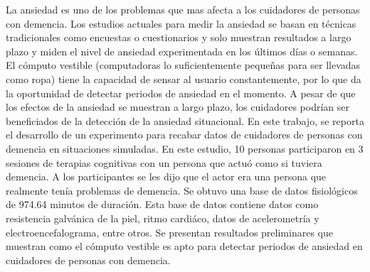 La ansiedad es uno de los problemas que mas afecta a los cuidadores de personas con demencia. Los estudios actuales para medir la ansiedad se basan en t\'ecnicas tradicionales como encuestas o cuestionarios y solo muestran resultados a largo plazo y miden el nivel de ansiedad experimentada en los \'ultimos d\'ias o semanas. El c\'omputo vestible (computadoras lo suficientemente peque\~nas para ser llevadas como ropa) tiene la capacidad de sensar al usuario constantemente, por lo que da la oportunidad de detectar periodos de ansiedad en el momento. A pesar de que los efectos de la ansiedad se muestran a largo plazo, los cuidadores podr\'ian ser beneficiados de la detecci\'on de la ansiedad situacional. En este trabajo, se reporta el desarrollo de un experimento para recabar datos de cuidadores de personas con demencia en situaciones simuladas. En este estudio, 10 personas participaron en 3 sesiones de terapias cognitivas con un persona que actu\'o como si tuviera demencia. A los participantes se les dijo que el actor era una persona que realmente ten\'ia problemas de demencia. Se obtuvo una base de datos fisiol\'ogicos de 974.64 minutos de duraci\'on. Esta base de datos contiene datos como resistencia galv\'anica de la piel, ritmo cardi\'aco, datos de acelerometr\'ia y electroencefalograma, entre otros. Se presentan resultados preliminares que muestran como el c\'omputo vestible es apto para detectar periodos de ansiedad en cuidadores de personas con demencia.
